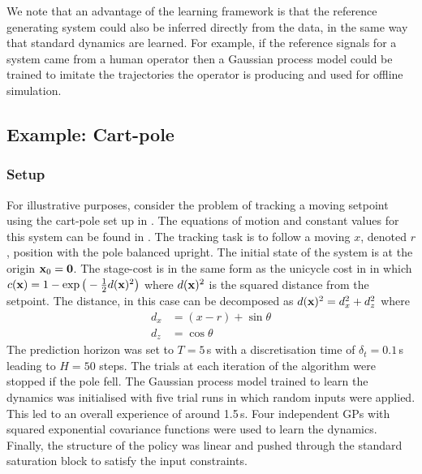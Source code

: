 We note that an advantage of the learning framework is that the reference generating system could also be inferred directly from the data, in the same way that standard dynamics are learned. For example, if the reference signals for a system came from a human operator then a Gaussian process model could be trained to imitate the trajectories the operator is producing and used for offline simulation.









\subsection{Example: Cart-pole}



\subsubsection{Setup}
For illustrative purposes, consider the problem of tracking a moving setpoint using the cart-pole set up in . The equations of motion and constant values for this system can be found in .
The tracking task is to follow a moving $x$, denoted $r$, position with the pole balanced upright. The initial state of the system is at the origin $\mathbf{x}_0 = \mathbf{0}$. The stage-cost is in the same form as the unicycle cost in  in which $c(\mathbf{x}) = 1 - \exp\big(-\tfrac{1}{2}d(\mathbf{x})^2\big)$ where $d(\mathbf{x})^2$ is the squared distance from the setpoint. The distance, in this case can be decomposed as $d(\mathbf{x})^2 = d_x^2 + d_z^2$ where
\begin{align*}
d_x &= (x-r) + \sin\theta \\
d_z &= \cos\theta
\end{align*}
The prediction horizon was set to $T = 5\,$s with a discretisation time of $\delta_t = 0.1\,$s leading to $H = 50$ steps. The trials at each iteration of the algorithm were stopped if the pole fell. The Gaussian process model trained to learn the dynamics was initialised with five trial runs in which random inputs were applied. This led to an overall experience of around 1.5$\,$s. Four independent GPs with squared exponential covariance functions were used to learn the dynamics. Finally, the structure of the policy was linear and pushed through the standard saturation block to satisfy the input constraints.

